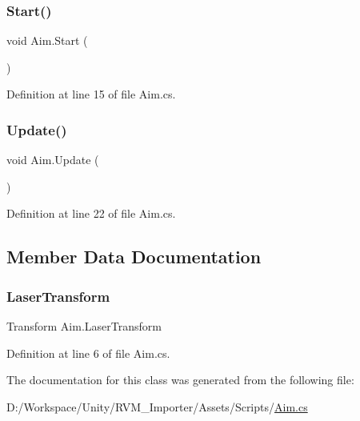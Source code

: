 \subsubsection{\texorpdfstring{Start()}{Start()}}
{\footnotesize\ttfamily void Aim.\+Start (\begin{DoxyParamCaption}{ }\end{DoxyParamCaption})}



Definition at line 15 of file Aim.\+cs.

\mbox{\label{class_aim_af6492a8eb4afae08a066e0e670d9dd19}} 
\subsubsection{\texorpdfstring{Update()}{Update()}}
{\footnotesize\ttfamily void Aim.\+Update (\begin{DoxyParamCaption}{ }\end{DoxyParamCaption})}



Definition at line 22 of file Aim.\+cs.



\subsection{Member Data Documentation}
\mbox{\label{class_aim_a7c3f5059710fa92c6f4d6442939103c8}} 
\subsubsection{\texorpdfstring{LaserTransform}{LaserTransform}}
{\footnotesize\ttfamily Transform Aim.\+Laser\+Transform}



Definition at line 6 of file Aim.\+cs.



The documentation for this class was generated from the following file\+:\begin{DoxyCompactItemize}
\item 
D\+:/\+Workspace/\+Unity/\+R\+V\+M\+\_\+\+Importer/\+Assets/\+Scripts/\mbox{\hyperlink{_aim_8cs}{Aim.\+cs}}\end{DoxyCompactItemize}
